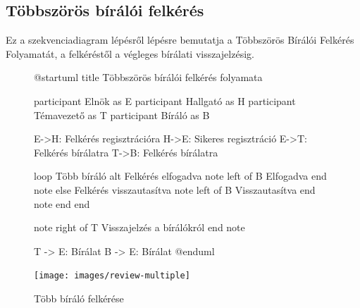 \documentclass[a4paper,12pt]{article}
\begin{document}
\subsection{Többszörös bírálói felkérés}

Ez a szekvenciadiagram lépésről lépésre bemutatja a Többszörös Bírálói Felkérés Folyamatát, a felkéréstől a végleges bírálati visszajelzésig.

\begin{figure}[h!]
\centering
\begin{plantuml}
@startuml
title Többszörös bírálói felkérés folyamata

participant Elnök as E
participant Hallgató as H
participant Témavezető as T
participant Bíráló as B

E->H: Felkérés regisztrációra
H->E: Sikeres regisztráció
E->T: Felkérés bírálatra
T->B: Felkérés bírálatra

loop Több bíráló
	alt Felkérés elfogadva
		note left of B 
		Elfogadva
		end note
	else Felkérés visszautasítva
		note left of B 
		Visszautasítva
		end note
	end
end

note right of T 
Visszajelzés a bírálókról
end note

T -> E: Bírálat
B -> E: Bírálat
@enduml
\end{plantuml}
\texttt{[image: images/review-multiple]}
\caption{Több bíráló felkérése}
\label{fig:review-multiple}
\end{figure}
\end{document}
